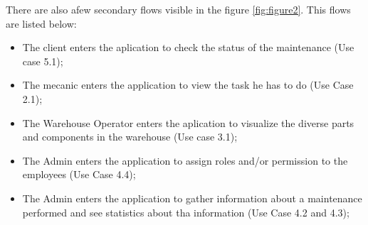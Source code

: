There are also afew secondary flows visible in the figure \ref{fig:figure2}. 
This flows are listed below:
\begin{itemize}
  \item The client enters the aplication to check the status of the maintenance (Use case 5.1);
  \item The mecanic enters the application to view the task he has to do (Use Case 2.1); 
  \item The Warehouse Operator enters the aplication to visualize the diverse parts and components in the warehouse (Use case 3.1); 
  \item The Admin enters the application to assign roles and/or permission to the employees (Use Case 4.4); 
  \item The Admin enters the application to gather information about a maintenance performed and see statistics about tha information (Use Case 4.2 and 4.3); 
\end{itemize}
 








